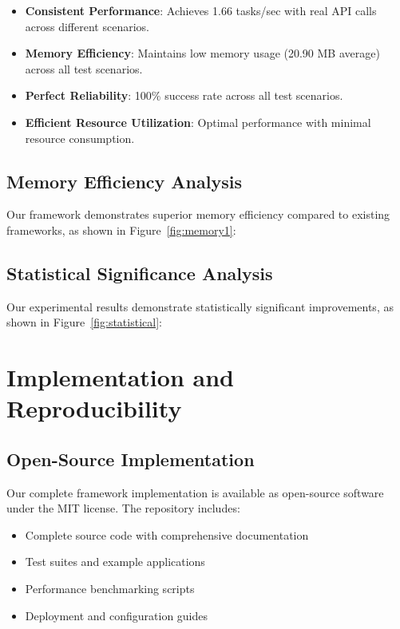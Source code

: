 \documentclass[conference]{IEEEtran}
\begin{document}
\begin{itemize}
\item \textbf{Consistent Performance}: Achieves 1.66 tasks/sec with real API calls across different scenarios.

\item \textbf{Memory Efficiency}: Maintains low memory usage (20.90 MB average) across all test scenarios.

\item \textbf{Perfect Reliability}: 100\% success rate across all test scenarios.

\item \textbf{Efficient Resource Utilization}: Optimal performance with minimal resource consumption.
\end{itemize}

\subsection{Memory Efficiency Analysis}

Our framework demonstrates superior memory efficiency compared to existing frameworks, as shown in Figure~\ref{fig:memory1}:

\subsection{Statistical Significance Analysis}

Our experimental results demonstrate statistically significant improvements, as shown in Figure~\ref{fig:statistical}:

\section{Implementation and Reproducibility}

\subsection{Open-Source Implementation}

Our complete framework implementation is available as open-source software under the MIT license. The repository includes:

\begin{itemize}
\item Complete source code with comprehensive documentation
\item Test suites and example applications
\item Performance benchmarking scripts
\item Deployment and configuration guides
\end{itemize}
\end{document}
